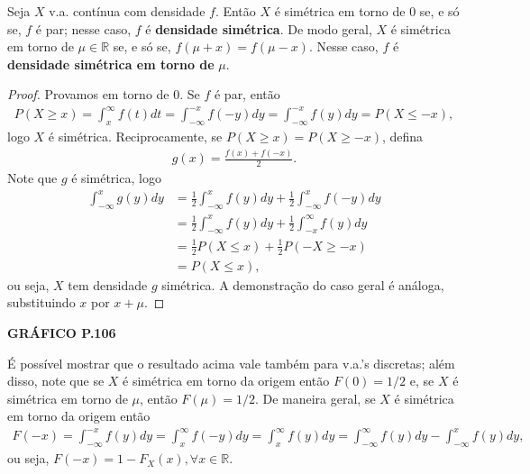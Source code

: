 \documentclass[../Notas.tex]{subfiles}
\begin{document}
\begin{theorem}
Seja $X$ v.a. contínua com densidade $f$. Então $X$ é simétrica em torno de 0 se, e só se, $f$ é par; nesse caso, $f$ é \textbf{densidade simétrica}. De modo geral, $X$ é simétrica em torno de $\mu\in\mathbb{R}$ se, e só se, $f(\mu + x) = f(\mu - x)$. Nesse caso, $f$ é \textbf{densidade simétrica em torno de} $\mu$.
\end{theorem}

\begin{proof}
Provamos em torno de 0. Se $f$ é par, então
\begin{align*}
    P(X\geq x) = \int_x^{\infty} f(t)dt = \int_{-\infty}^{-x} f(-y)dy = \int_{-\infty}^{-x} f(y)dy = P(X\leq -x),
\end{align*}
logo $X$ é simétrica. Reciprocamente, se $P(X\geq x) = P(X\geq -x)$, defina
\begin{align*}
    g(x) = \frac{f(x) + f(-x)}{2}.
\end{align*}
Note que $g$ é simétrica, logo
\begin{align*}
    \int_{-\infty}^x g(y) dy &= \frac{1}{2}\int_{-\infty}^x f(y) dy + \frac{1}{2}\int_{-\infty}^x f(-y) dy \\
    &= \frac{1}{2}\int_{-\infty}^x f(y) dy + \frac{1}{2}\int_{-x}^{\infty} f(y) dy \\
    &= \frac{1}{2}P(X\leq x) + \frac{1}{2}P(-X\geq -x) \\
    &= P(X\leq x),
\end{align*}
ou seja, $X$ tem densidade $g$ simétrica. A demonstração do caso geral é análoga, substituindo $x$ por $x+\mu$.
\end{proof}

\begin{center}
    \textbf{GRÁFICO P.106}
\end{center}

\begin{remark}
É possível mostrar que o resultado acima vale também para v.a.'s discretas; além disso, note que se $X$ é simétrica em torno da origem então $F(0) = 1/2$ e, se $X$ é simétrica em torno de $\mu$, então $F(\mu) = 1/2$. De maneira geral, se $X$ é simétrica em torno da origem então
\begin{align*}
    F(-x) = \int_{-\infty}^{-x}f(y) dy = \int_x^{\infty} f(-y)dy = \int_x^{\infty} f(y) dy = \int_{-\infty}^{\infty} f(y) dy - \int_{-\infty}^x f(y) dy,
\end{align*}
ou seja, $F(-x) = 1 - F_X(x), \forall x\in\mathbb{R}$.
\end{remark}
\end{document}
